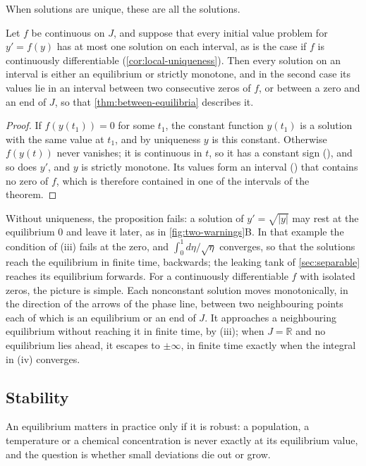 When solutions are unique, these are all the solutions.

\begin{proposition}
\label{prop:autonomous-monotone}
Let $f$ be continuous on $J$, and suppose that every initial value problem for $y'=f(y)$ has at most one solution on each interval, as is the case if $f$ is continuously differentiable (\cref{cor:local-uniqueness}). Then every solution on an interval is either an equilibrium or strictly monotone, and in the second case its values lie in an interval between two consecutive zeros of $f$, or between a zero and an end of $J$, so that \cref{thm:between-equilibria} describes it.
\end{proposition}

\begin{proof}
If $f(y(t_1))=0$ for some $t_1$, the constant function $y(t_1)$ is a solution with the same value at $t_1$, and by uniqueness $y$ is this constant. Otherwise $f(y(t))$ never vanishes; it is continuous in $t$, so it has a constant sign (), and so does $y'$, and $y$ is strictly monotone. Its values form an interval () that contains no zero of $f$, which is therefore contained in one of the intervals of the theorem.
\end{proof}

Without uniqueness, the proposition fails: a solution of $y'=\sqrt{|y|}$ may rest at the equilibrium $0$ and leave it later, as in \cref{fig:two-warnings}B. In that example the condition of (iii) fails at the zero, and $\int_0^1d\eta/\sqrt\eta$ converges, so that the solutions reach the equilibrium in finite time, backwards; the leaking tank of \cref{sec:separable} reaches its equilibrium forwards. For a continuously differentiable $f$ with isolated zeros, the picture is simple. Each nonconstant solution moves monotonically, in the direction of the arrows of the phase line, between two neighbouring points each of which is an equilibrium or an end of $J$. It approaches a neighbouring equilibrium without reaching it in finite time, by (iii); when $J=\mathbb R$ and no equilibrium lies ahead, it escapes to $\pm\infty$, in finite time exactly when the integral in (iv) converges.

\subsection{Stability}

An equilibrium matters in practice only if it is robust: a population, a temperature or a chemical concentration is never exactly at its equilibrium value, and the question is whether small deviations die out or grow.

